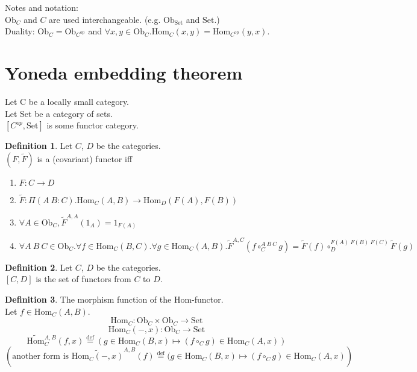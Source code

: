 \documentclass[10pt,a4paper]{article}
\theoremstyle{definition}
\newtheorem{definition}{Definition}[section]
\newcommand{\Ob}{{\mbox{Ob}}}
\newcommand{\Hom}{{\mbox{Hom}}}
\newcommand{\op}{{\mbox{op}}}
\newcommand{\defi}{{\mbox{def}}}
\newcommand{\eqdef}{{\stackrel{\defi}{=}}}
\newcommand{\Set}{{\mbox{Set}}}
\newcommand{\ra}{{\rightarrow}}
\begin{document}
Notes and notation:\\
$\Ob_C$ and $C$ are used interchangeable. (e.g. $\Ob_\Set$ and $\Set$.)\\
Duality: $\Ob_C = \Ob_{C^\op}$ and 
 $\forall x,y \in \Ob_C. \Hom_C(x,y) = \Hom_{C^\op}(y,x)$.

\section{Yoneda embedding theorem}
Let C be a locally small category.\\
Let Set be a category of sets.\\
$[C^{op},\mbox{Set}]$ is some functor category.\\

\begin{definition}
Let $C$, $D$ be the categories.\\
 $(F, \widetilde{F})$ is a (covariant) functor iff\\
\begin{enumerate}
\item $F:C \ra D$
\item $\widetilde{F}:\Pi(A\ B:C).\Hom_C(A,B) \ra \Hom_D(F(A), F(B))$
\item $\forall A\in \Ob_C, \widetilde{F}^{A,A}(1_A)=1_{F(A)}$
\item $\forall A\ B\ C \in \Ob_C.\forall f\in\Hom_C(B,C).\forall g\in\Hom_C(A,B). \widetilde{F}^{A,C}(f\circ_C^{A\ B\ C} g)=\widetilde{F}(f)\circ_D^{F(A)\ F(B)\ F(C)} \widetilde{F}(g)$
\end{enumerate}

\end{definition}

\begin{definition}
Let $C$, $D$ be the categories.\\
$[C,D]$ is the set of functors from $C$ to $D$.\\
\end{definition}

\begin{definition} The morphism function of the Hom-functor.\\
Let $f\in\Hom_{C}(A,B)$.
$$\Hom_C: \Ob_C \times \Ob_C \to \Set$$
$$\Hom_C(-,x): \Ob_C \to \Set$$
$$\widetilde{\Hom}\mbox{}^{A,B}_C(f,x) \eqdef (g \in\Hom_C(B,x) \mapsto (f \circ_C g) \in\Hom_C(A,x))$$
$$\left(\mbox{another form is }\widetilde{\Hom_C(-,x)}^{A,B}(f) \eqdef (g \in\Hom_C(B,x) \mapsto (f \circ_C g) \in\Hom_C(A,x)\right)$$
\end{definition}
\end{document}
